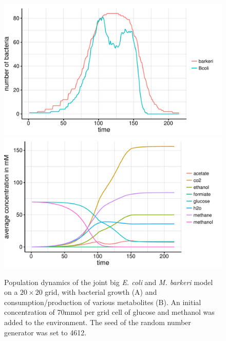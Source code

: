 \begin{figure}[h!]
  \centering
    \includegraphics[scale=0.45]{../results/img/barkeri_ecoli_20x20_seed4612_growth.pdf}
    \includegraphics[scale=0.45]{../results/img/barkeri_ecoli_20x20_seed4612_subs.pdf}
  \caption{Population dynamics of the joint big \emph{E. coli} and \emph{M. barkeri} model on a $20\times20$ grid, with bacterial growth (A) and consumption/production of various metabolites (B). An initial concentration of 70\;mmol per grid cell of glucose and methanol was added to the environment. The seed of the random number generator was set to 4612.}
  \label{fig:besg}
\end{figure}
